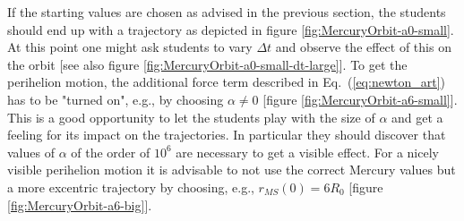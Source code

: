 \documentclass[12pt,ngerman,american]{iopart}
\begin{document}
If the starting values are chosen as advised in the previous section, the students should end up with a trajectory as depicted in figure \ref{fig:MercuryOrbit-a0-small}.
At this point one might ask students to vary $\Delta t$ and observe the effect of this on the orbit [see also figure \ref{fig:MercuryOrbit-a0-small-dt-large}].
To get the perihelion motion, the additional force term described in Eq.~(\ref{eq:newton_art}) has to be "turned on", e.g., by choosing  $\alpha\neq0$
[figure \ref{fig:MercuryOrbit-a6-small}].
This is a good opportunity to let the students play with the size of $\alpha$ and get a feeling for its impact on the trajectories. In particular
they should discover that values of $\alpha$ of the order of $10^6$ are necessary to get a visible effect.
For a nicely visible  perihelion motion it is advisable to not  use the correct Mercury values but a more excentric trajectory by choosing, e.g., $r_{MS}(0)=6R_0$ [figure \ref{fig:MercuryOrbit-a6-big}].
\end{document}
